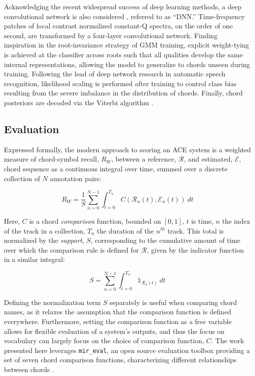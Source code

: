 \documentclass{article}
\begin{document}
Acknowledging the recent widespread success of deep learning methods, a deep convolutional network is also considered \cite{Humphrey2015Exploration}, referred to as ``DNN.''
Time-frequency patches of local contrast normalized constant-Q spectra, on the order of one second, are transformed by a four-layer convolutional network.
Finding inspiration in the root-invariance strategy of GMM training, explicit weight-tying is achieved at the classifier across roots such that all qualities develop the same internal representations, allowing the model to generalize to chords unseen during training.
Following the lead of deep network research in automatic speech recognition, likelihood scaling is performed after training to control class bias resulting from the severe imbalance in the distribution of chords.
Finally, chord posteriors are decoded via the Viterbi algorithm \cite{Cho2010Exploring}.


\subsection{Evaluation}
\label{subsec:eval}

Expressed formally, the modern approach to scoring an ACE system is a weighted measure of chord-symbol recall, $R_{W}$, between a reference, $\mathcal{R}$, and estimated, $\mathcal{E}$, chord sequence as a continuous integral over time, summed over a discrete collection of $N$ annotation pairs:

\begin{equation}
\label{eq:recall_micro}
R_{W} = \frac{1}{S}\sum_{n=0}^{N-1}\int_{t=0}^{T_n}C(\mathcal{R}_n(t), \mathcal{E}_n(t))~dt
\end{equation}

\noindent Here, $C$ is a chord \emph{comparison} function, bounded on $[0, 1]$, $t$ is time, $n$ the index of the track in a collection, $T_n$ the duration of the $n^{th}$ track. This total is normalized by the \emph{support}, $S$, corresponding to the cumulative amount of time over which the comparison rule is defined for $\mathcal{R}$, given by the indicator function in a similar integral:

\begin{equation}
S = \sum_{n=0}^{N-1}\int_{t=0}^{T_n}\mathds{1}_{\mathcal{R}_n(t)}~dt
\end{equation}

Defining the normalization term $S$ separately is useful when comparing chord names, as it relaxes the assumption that the comparison function is defined everywhere.
Furthermore, setting the comparison function as a free variable allows for flexible evaluation of a system's outputs, and thus the focus on vocabulary can largely focus on the choice of comparison function, $C$.
The work presented here leverages \texttt{mir\_eval}, an open source evaluation toolbox providing a set of seven chord comparison functions, characterizing different relationships between chords \cite{Raffel2014Eval}.
\end{document}
